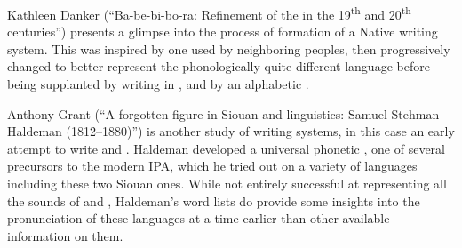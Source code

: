 \begin{refsection}
Kathleen Danker (``Ba-be-bi-bo-ra: Refinement of the   in the 19\textsuperscript{th} and 20\textsuperscript{th} centuries'') presents a glimpse into the process of formation of a Native writing system. This  was inspired by one used by neighboring  peoples, then progressively changed to better represent the phonologically quite different  language before being supplanted by writing in , and by an alphabetic  .

Anthony Grant (``A forgotten figure in Siouan and  linguistics: Samuel Stehman Haldeman (1812--1880)'') is another study of writing systems, in this case an early attempt to write  and . Haldeman developed a universal phonetic , one of several precursors to the modern IPA, which he tried out on a variety of languages including these two Siouan ones. While not entirely successful at representing all the sounds of  and , Haldeman's word lists do provide some insights into the pronunciation of these languages at a time earlier than other available information on them. 

 

\printbibliography[heading=subbibliography]
 

\end{refsection}
